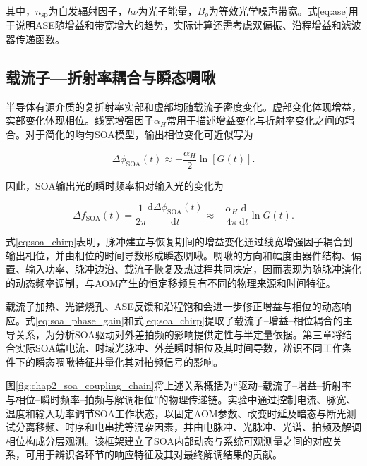 其中，$n_{\mathrm{sp}}$为自发辐射因子，$h\nu$为光子能量，$B_o$为等效光学噪声带宽。式\eqref{eq:ase}用于说明ASE随增益和带宽增大的趋势，实际计算还需考虑双偏振、沿程增益和滤波器传递函数\cite{baveja2010selfphase}。

\subsection{载流子—折射率耦合与瞬态啁啾}

半导体有源介质的复折射率实部和虚部均随载流子密度变化。虚部变化体现增益，实部变化体现相位。线宽增强因子$\alpha_H$常用于描述增益变化与折射率变化之间的耦合。对于简化的均匀SOA模型，输出相位变化可近似写为

\begin{equation}
\Delta\phi_{\mathrm{SOA}}(t)
\approx
-\frac{\alpha_H}{2}
\ln\left[G(t)\right].
\label{eq:soa_phase_gain}
\end{equation}

因此，SOA输出光的瞬时频率相对输入光的变化为

\begin{equation}
\Delta f_{\mathrm{SOA}}(t)
=
\frac{1}{2\pi}
\frac{\mathrm d\Delta\phi_{\mathrm{SOA}}(t)}{\mathrm dt}
\approx
-\frac{\alpha_H}{4\pi}
\frac{\mathrm d}{\mathrm dt}\ln G(t).
\label{eq:soa_chirp}
\end{equation}

式\eqref{eq:soa_chirp}表明，脉冲建立与恢复期间的增益变化通过线宽增强因子耦合到输出相位，并由相位的时间导数形成瞬态啁啾。啁啾的方向和幅度由器件结构、偏置、输入功率、脉冲边沿、载流子恢复及热过程共同决定，因而表现为随脉冲演化的动态频率调制，与AOM产生的恒定移频具有不同的物理来源和时间特征\cite{cao2002characterization,matsuura2015chirp,sutili2021chirp,connelly2023dynamic}。

载流子加热、光谱烧孔、ASE反馈和沿程饱和会进一步修正增益与相位的动态响应\cite{baveja2010selfphase,sobhanan2022soa}。式\eqref{eq:soa_phase_gain}和式\eqref{eq:soa_chirp}提取了载流子--增益--相位耦合的主导关系，为分析SOA驱动对外差拍频的影响提供定性与半定量依据。第三章将结合实际SOA端电流、时域光脉冲、外差瞬时相位及其时间导数，辨识不同工作条件下的瞬态啁啾特征并量化其对拍频信号的影响。

图\ref{fig:chap2_soa_coupling_chain}将上述关系概括为“驱动--载流子--增益--折射率与相位--瞬时频率--拍频与解调相位”的物理传递链。实验中通过控制电流、脉宽、温度和输入功率调节SOA工作状态，以固定AOM参数、改变时延及暗态与断光测试分离移频、时序和电串扰等混杂因素，并由电脉冲、光脉冲、光谱、拍频及解调相位构成分层观测。该框架建立了SOA内部动态与系统可观测量之间的对应关系，可用于辨识各环节的响应特征及其对最终解调结果的贡献。

